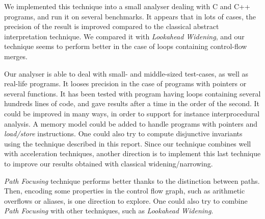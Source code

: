 \documentclass[a4paper,english,titlepage,11pt]{report}
\begin{document}
	We implemented this technique into a small analyser dealing with C and C++
	programs, and run it on several
	benchmarks.
	It appears that in lots of cases, 
	the precision of the result is improved 
	compared to the classical abstract interpretation technique.
	We compared it with \emph{Lookahead Widening}, and our technique seems to
	perform better in the case of loops containing control-flow merges. 

	Our analyser is able to deal with small- and middle-sized test-cases, as
	well as real-life programs. It looses
	precision in the case of programs with pointers or several functions.
	It has been tested with program having loops containing several hundreds
	lines of code, and gave results after a time in the order of the second.
	It could be improved in many ways, in order to support
	for instance interprocedural analysis. A memory model could be added to
	handle programs with pointers and \emph{load/store} instructions.
	One could also try to compute disjunctive invariants using the technique
	described in this report.
	Since our technique combines well with acceleration techniques, another
	direction is to implement this last technique to improve our results
	obtained with classical widening/narrowing.
	

	\emph{Path Focusing} technique performs better thanks to the distinction
	between
	paths. Then, encoding some properties in the control flow graph, such as
	arithmetic overflows or aliases, is one direction to explore. One could also
	try to combine \emph{Path Focusing} with other techniques, such as
	\emph{Lookahead Widening}.



  

  \appendix
\appendixpage
\renewcommand{\thesection}{\Alph{section}}
\end{document}
